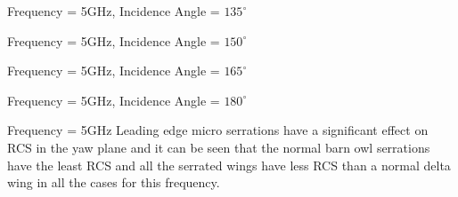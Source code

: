 \documentclass{beamer}
\begin{document}
\begin{frame}{Frequency = 5GHz, Incidence Angle = $135^\circ$}
	
\end{frame}

\begin{frame}{Frequency = 5GHz, Incidence Angle = $150^\circ$}
	
\end{frame}

\begin{frame}{Frequency = 5GHz, Incidence Angle = $165^\circ$}
	
\end{frame}

\begin{frame}{Frequency = 5GHz, Incidence Angle = $180^\circ$}
	
\end{frame}

\begin{frame}{Frequency = 5GHz}
\justifying
Leading edge micro serrations have a significant effect on RCS in the yaw plane and it can be seen that the normal barn owl serrations have the least RCS and all the serrated wings have less RCS than a normal delta wing in all the cases for this frequency. 
\end{frame}
\end{document}
